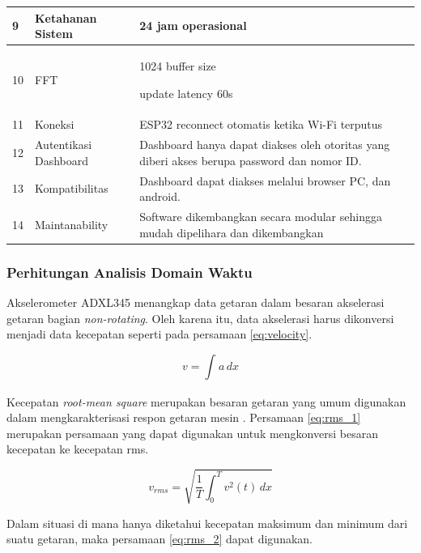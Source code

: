 \documentclass{elsinta}
\begin{document}
\begin{longtable}{|p{1.5cm}|p{3cm}|p{9cm}|}
    9 & Ketahanan Sistem &
    24 jam operasional
    \\
    \hline

    10 & FFT &
    1024 buffer size

    update latency 60s
    \\
    \hline
    
    11 & Koneksi &
    ESP32 reconnect otomatis ketika Wi-Fi terputus
    \\
    \hline
    
    12 & Autentikasi Dashboard &
    Dashboard hanya dapat diakses oleh otoritas yang diberi akses berupa password dan nomor ID.
    \\
    \hline

    13 & Kompatibilitas &
    Dashboard dapat diakses melalui browser PC, dan android.
    \\
    \hline

    14 & Maintanability &
    Software dikembangkan secara modular sehingga mudah dipelihara dan dikembangkan
    \\
    \hline

\end{longtable}

\subsubsection{Perhitungan Analisis Domain Waktu}
    Akselerometer ADXL345 menangkap data getaran
    dalam besaran akselerasi getaran bagian \textit{non-rotating}. 
    Oleh karena itu,
    data akselerasi harus dikonversi menjadi data
    kecepatan seperti pada persamaan \ref{eq:velocity}\cite{2.1.3}.

    \begin{equation}
        \label{eq:velocity}
        v=\int_{}^{}a\,dx
    \end{equation}

    Kecepatan \textit{root-mean square} merupakan
    besaran getaran yang umum digunakan dalam
    mengkarakterisasi respon getaran mesin \cite{2.1.3}.
    Persamaan \ref{eq:rms_1} merupakan persamaan
    yang dapat digunakan untuk mengkonversi besaran
    kecepatan ke kecepatan rms.

    \begin{equation}
        \label{eq:rms_1}
        v_{rms}=\sqrt{\frac{1}{T} \int_{0}^{T} v^{2}(t)\,dx}
    \end{equation}

    Dalam situasi di mana hanya diketahui kecepatan
    maksimum dan minimum dari suatu getaran, maka
    persamaan \ref{eq:rms_2} dapat digunakan.
\end{document}
